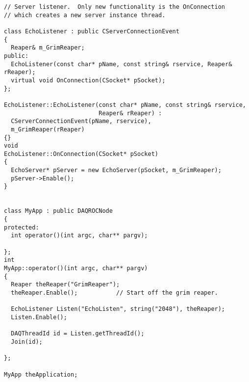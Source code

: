 \begin{verbatim}
// Server listener.  Only new functionality is the OnConnection
// which creates a new server instance thread.

class EchoListener : public CServerConnectionEvent
{
  Reaper& m_GrimReaper;
public:
  EchoListener(const char* pName, const string& rservice, Reaper& rReaper);
  virtual void OnConnection(CSocket* pSocket);
};

EchoListener::EchoListener(const char* pName, const string& rservice,
                           Reaper& rReaper) :
  CServerConnectionEvent(pName, rservice),
  m_GrimReaper(rReaper)
{}
void
EchoListener::OnConnection(CSocket* pSocket)
{
  EchoServer* pServer = new EchoServer(pSocket, m_GrimReaper);
  pServer->Enable();
}


class MyApp : public DAQROCNode
{
protected:
  int operator()(int argc, char** pargv);

};
int
MyApp::operator()(int argc, char** pargv)
{
  Reaper theReaper("GrimReaper");
  theReaper.Enable();           // Start off the grim reaper.

  EchoListener Listen("EchoListen", string("2048"), theReaper);
  Listen.Enable();

  DAQThreadId id = Listen.getThreadId();
  Join(id);
  
};

MyApp theApplication;
\end{verbatim}\normalsize 


